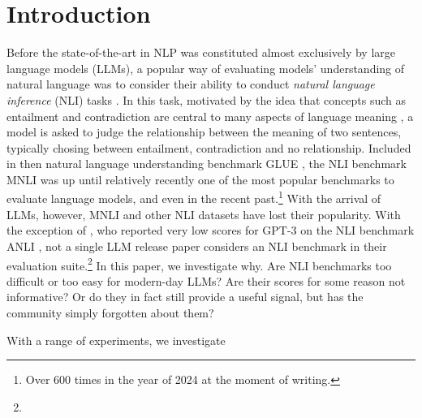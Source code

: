 \section{Introduction}

Before the state-of-the-art in NLP was constituted almost exclusively by large language models (LLMs), a popular way of evaluating models' understanding of natural language was to consider their ability to conduct \emph{natural language inference} (NLI) tasks \citep[most famously,][]{bowman-etal-2015-large,williams-etal-2018-broad}.
In this task, motivated by the idea that concepts such as entailment and contradiction are central to many aspects of language meaning \citep{bowman-etal-2015-large},  a model is asked to judge the relationship between the meaning of two sentences, typically chosing between entailment, contradiction and no relationship.
Included in then natural language understanding benchmark GLUE \citep{wang2019glue}, the NLI benchmark MNLI \citep{williams-etal-2018-broad} was up until relatively recently one of the most popular benchmarks to evaluate language models, and even in the recent past.\footnote{Over 600 times in the year of 2024 at the moment of writing.}
With the arrival of LLMs, however, MNLI and other NLI datasets have lost their popularity.
With the exception of \citet{brown2020languagemodelsfewshotlearners},  who reported very low scores for GPT-3 on the NLI benchmark ANLI \citep{nie-etal-2020-adversarial}, not a single LLM release paper considers an NLI benchmark in their evaluation suite.\footnote{}
In this paper, we investigate why.
Are NLI benchmarks too difficult or too easy for modern-day LLMs?
Are their scores for some reason not informative?
Or do they in fact still provide a useful signal, but has the community simply forgotten about them?

With a range of experiments, we investigate 


